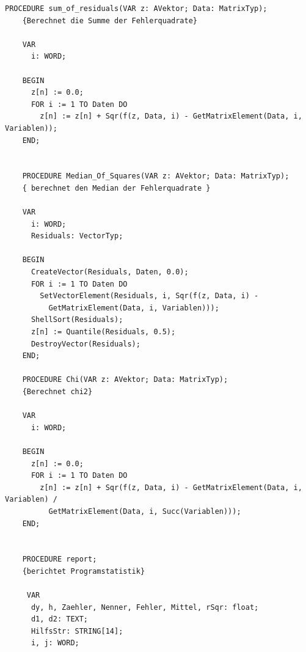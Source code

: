 \begin{refsection}
\begin{lstlisting}[caption=Simplex]
    PROCEDURE sum_of_residuals(VAR z: AVektor; Data: MatrixTyp);
    {Berechnet die Summe der Fehlerquadrate}

    VAR
      i: WORD;

    BEGIN
      z[n] := 0.0;
      FOR i := 1 TO Daten DO
        z[n] := z[n] + Sqr(f(z, Data, i) - GetMatrixElement(Data, i, Variablen));
    END;


    PROCEDURE Median_Of_Squares(VAR z: AVektor; Data: MatrixTyp);
    { berechnet den Median der Fehlerquadrate }

    VAR
      i: WORD;
      Residuals: VectorTyp;

    BEGIN
      CreateVector(Residuals, Daten, 0.0);
      FOR i := 1 TO Daten DO
        SetVectorElement(Residuals, i, Sqr(f(z, Data, i) -
          GetMatrixElement(Data, i, Variablen)));
      ShellSort(Residuals);
      z[n] := Quantile(Residuals, 0.5);
      DestroyVector(Residuals);
    END;

    PROCEDURE Chi(VAR z: AVektor; Data: MatrixTyp);
    {Berechnet chi2}

    VAR
      i: WORD;

    BEGIN
      z[n] := 0.0;
      FOR i := 1 TO Daten DO
        z[n] := z[n] + Sqr(f(z, Data, i) - GetMatrixElement(Data, i, Variablen) /
          GetMatrixElement(Data, i, Succ(Variablen)));
    END;


    PROCEDURE report;
    {berichtet Programstatistik}

     VAR
      dy, h, Zaehler, Nenner, Fehler, Mittel, rSqr: float;
      d1, d2: TEXT;
      HilfsStr: STRING[14];
      i, j: WORD;


\end{lstlisting}
\end{refsection}
